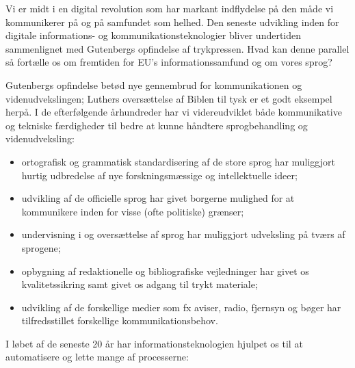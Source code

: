 \documentclass[]{../../metanetpaper}
\begin{document}
\begin{multicols}{2}

Vi er midt i en digital revolution som har markant indflydelse \mbox{p\aa} den m\aa de vi kommunikerer \mbox{p\aa} og \mbox{p\aa} samfundet som helhed. Den seneste udvikling inden for digitale informations- og kommunikationsteknologier bliver undertiden sammenlignet med Gutenbergs opfindelse af trykpressen. Hvad kan denne parallel \mbox{s\aa} fort\ae lle os om fremtiden for EU's informationssamfund og om vores sprog?


Gutenbergs opfindelse bet\o d nye gennembrud for kommunikationen og videnudvekslingen; Luthers overs\ae ttelse af Biblen til tysk er et godt eksempel \mbox{herp\aa}. I de efterf\o lgende \aa rhundreder har vi videreudviklet b\aa de kommunikative og tekniske f\ae rdigheder til bedre at kunne h\aa ndtere sprogbehandling og videnudveksling: 

 \begin{itemize}
      \item ortografisk og grammatisk standardisering af de store sprog har muliggjort hurtig udbredelse af nye forskningsm\ae ssige og intellektuelle ideer;
      \item udvikling af de officielle sprog har givet borgerne mulighed for at kommunikere inden for visse (ofte politiske) gr\ae nser;
      \item undervisning i og overs\ae ttelse af sprog har muliggjort udveksling \mbox{p\aa} tv\ae rs af sprogene;
\item opbygning af redaktionelle og bibliografiske vejledninger har givet os kvalitetssikring samt givet os adgang til trykt materiale;
      \item udvikling af de forskellige medier som fx aviser, radio, fjernsyn og b\o ger har tilfredsstillet forskellige kommunikationsbehov.
    \end{itemize}

 I l\o bet af de seneste 20 \aa r har informationsteknologien hjulpet os til at automatisere og lette mange af processerne:


\end{multicols}
\end{document}
